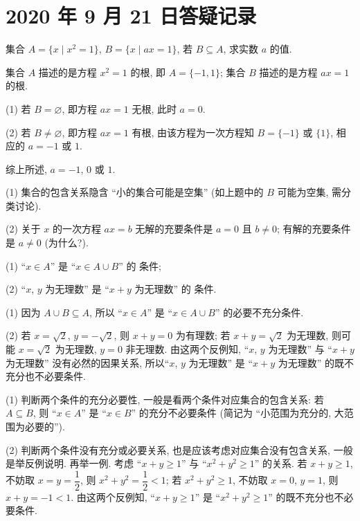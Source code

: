 \section{2020 年 9 月 21 日答疑记录}

\begin{example}
  集合 $A=\{x\mid x^2=1\}$, $B=\{x\mid ax=1\}$, 若 $B\subseteq A$, 求实数 $a$ 的值.
\end{example}
\begin{solution}
  集合 $A$ 描述的是方程 $x^2=1$ 的根, 即 $A=\{-1,1\}$; 集合 $B$ 描述的是方程 $ax=1$ 的根.
  
  (1) 若 $B=\varnothing$, 即方程 $ax=1$ 无根, 此时 $a=0$.
  
  (2) 若 $B\neq\varnothing$, 即方程 $ax=1$ 有根, 由该方程为一次方程知 $B= \{-1\}$ 或 $\{1\}$, 相应的 $a=-1$ 或 $1$.
  
  综上所述, $a=-1$, $0$ 或 $1$.
\end{solution}
\begin{remark}
  (1) 集合的包含关系隐含 ``小的集合可能是空集'' (如上题中的 $B$ 可能为空集, 需分类讨论).
  
  (2) 关于 $x$ 的一次方程 $ax=b$ 无解的充要条件是 $a=0$ 且 $b\neq 0$; 有解的充要条件是 $a\neq 0$ (为什么?). 
\end{remark}

\begin{example}
  (1) ``$x\in A$'' 是 ``$x\in A\cup B$'' 的 \underline{\hskip 2cm} 条件;
  
  (2) ``$x$, $y$ 为无理数'' 是 ``$x+y$ 为无理数'' 的 \underline{\hskip 2cm} 条件.
\end{example}
\begin{solution}
  (1) 因为 $A\cup B \subseteq A$, 所以 ``$x\in A$'' 是 ``$x\in A\cup B$'' 的必要不充分条件.
  
  (2) 若 $x=\sqrt2$, $y=-\sqrt2$, 则 $x+y=0$ 为有理数; 若 $x+y=\sqrt2$ 为无理数, 则可能 $x=\sqrt2$ 为无理数, $y=0$ 非无理数. 由这两个反例知, ``$x$, $y$ 为无理数'' 与 ``$x+y$ 为无理数'' 没有必然的因果关系, 所以``$x$, $y$ 为无理数'' 是 ``$x+y$ 为无理数'' 的既不充分也不必要条件.
\end{solution}
\begin{remark}
  (1) 判断两个条件的充分必要性, 一般是看两个条件对应集合的包含关系: 若 $A\subseteq B$, 则 ``$x\in A$'' 是 ``$x\in B$'' 的充分不必要条件 (简记为 ``小范围为充分的, 大范围为必要的''). 
  
  (2) 判断两个条件没有充分或必要关系, 也是应该考虑对应集合没有包含关系, 一般是举反例说明. 再举一例. 考虑 ``$x+y\geqslant 1$'' 与 ``$x^2+y^2\geqslant 1$'' 的关系. 若 $x+y\geqslant 1$, 不妨取 $x=y=\dfrac12$, 则 $x^2+y^2=\dfrac12< 1$; 若 $x^2+y^2\geqslant 1$, 不妨取 $x=0$, $y=1$, 则 $x+y=-1< 1$. 由这两个反例知, ``$x+y\geqslant 1$'' 是 ``$x^2+y^2\geqslant 1$'' 的既不充分也不必要条件.
\end{remark}

% 
